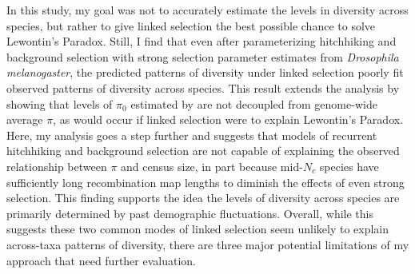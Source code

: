 \documentclass[9pt,lineno]{elife}
\begin{document}
In this study, my goal was not to accurately estimate the levels in diversity
across species, but rather to give linked selection the best possible chance to
solve Lewontin's Paradox. Still, I find that even after parameterizing
hitchhiking and background selection with strong selection parameter estimates
from \emph{Drosophila melanogaster}, the predicted patterns of diversity under
linked selection poorly fit observed patterns of diversity across species.
This result extends the analysis by \cite{Coop2016-gx} showing that levels
of $\pi_0$ estimated by \cite{Corbett-Detig2015-gt} are not decoupled from
genome-wide average $\pi$, as would occur if linked selection were to explain
Lewontin's Paradox. Here, my analysis goes a step further and suggests that
models of recurrent hitchhiking and background selection are not capable of
explaining the observed relationship between $\pi$ and census size, in part
because mid-$N_c$ species have sufficiently long recombination map lengths to
diminish the effects of even strong selection. This finding supports the idea
the levels of diversity across species are primarily determined by past
demographic fluctuations. Overall, while this suggests these two common modes
of linked selection seem unlikely to explain across-taxa patterns of diversity,
there are three major potential limitations of my approach that need further
evaluation. 
\end{document}
